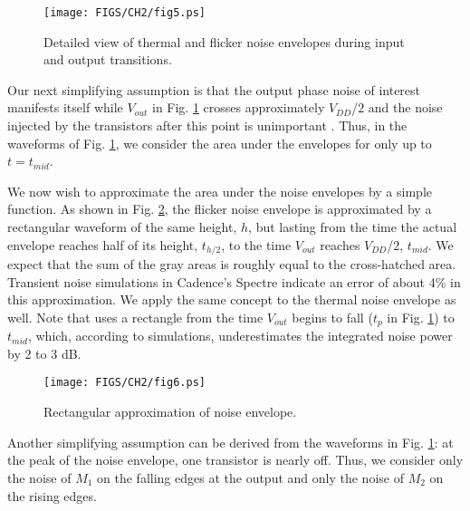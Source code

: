 \begin{figure}[htb!]
\centering
\texttt{[image: FIGS/CH2/fig5.ps]}
\caption{Detailed view of thermal and flicker noise envelopes during input and output transitions.}
\label{fig:noiseenvelope}
\end{figure}

Our next simplifying assumption is that the output phase noise of interest manifests itself while $V_{out}$ in Fig. \ref{fig:noiseenvelope} crosses
approximately $V_{DD}$/$2$ and the noise injected by the transistors after this point is unimportant \cite{Abidi}. Thus, in the waveforms of Fig.
\ref{fig:noiseenvelope}, we consider the area under the envelopes for only up to $t=t_{mid}$. 

We now wish to approximate the area under the noise envelopes by a simple function. As shown in Fig. \ref{fig:deltat}, the flicker noise envelope is
approximated by a rectangular waveform of the same height, $h$, but lasting from the time the actual envelope reaches half of its height,
$t_{h/2}$, to the time $V_{out}$ reaches $V_{DD}$/$2$, $t_{mid}$.
We expect that the sum of the gray areas is roughly equal to the cross-hatched area. Transient noise simulations in Cadence's Spectre indicate an
error of about 4\% in this approximation. We apply the same concept to the thermal noise envelope as well. Note that \cite{Abidi} uses a
rectangle from the time $V_{out}$ begins to fall ($t_p$ in Fig. \ref{fig:noiseenvelope}) to $t_{mid}$, which, according to simulations, underestimates
the integrated noise power by 2 to 3 dB.

\begin{figure}[htb!]
\centering
\texttt{[image: FIGS/CH2/fig6.ps]}
\caption{Rectangular approximation of noise envelope.}
\label{fig:deltat}
\end{figure}

Another simplifying assumption can be derived from the waveforms in Fig. \ref{fig:noiseenvelope}: at the peak of the noise
envelope, one transistor is nearly off. Thus, we consider only the noise of $M_1$ on the falling edges at the output and only the noise of $M_2$ on
the rising edges.

